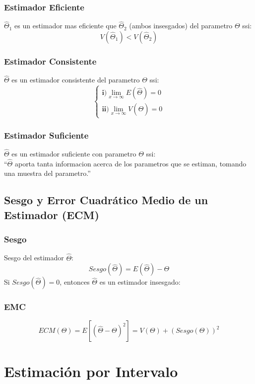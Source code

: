 \subsubsection{Estimador Eficiente}
$\widehat{\Theta}_1$ es un estimador mas eficiente que $\widehat{\Theta}_2$ (ambos insesgados) del parametro $\Theta$ ssi:
$$ V(\widehat{\Theta}_1) < V(\widehat{\Theta}_2) $$
\subsubsection{Estimador Consistente}
$\widehat{\Theta}$ es un estimador consistente del parametro $\Theta$ ssi:
$$
\begin{cases}
\textbf{i)} \displaystyle\lim_{x\to\infty} E(\widehat{\Theta})=0 \\
\textbf{ii)} \displaystyle\lim_{x\to\infty} V(\widehat{\Theta})=0
\end{cases}
$$
\subsubsection{Estimador Suficiente}
$\widehat{\Theta}$ es un estimador suficiente con parametro  $\Theta$ ssi: \\${ }$\\

``$\widehat{\Theta}$ aporta tanta informacion acerca de los parametros que se estiman, tomando una muestra del parametro.''
\subsection{Sesgo y Error Cuadrático Medio de un Estimador (ECM)}
\subsubsection{Sesgo}
Sesgo del estimador $\widehat{\Theta}$:
$$Sesgo(\widehat{\Theta}) =  E(\widehat{\Theta}) - \Theta$$
Si $Sesgo(\widehat{\Theta})=0$, entonces $\widehat{\Theta}$ es un estimador insesgado:
\subsubsection{EMC}
$$ ECM(\Theta) = E[(\widehat{\Theta}-\Theta)^2] = V(\Theta) + (Sesgo(\Theta))^2$$
\section{Estimación por Intervalo}